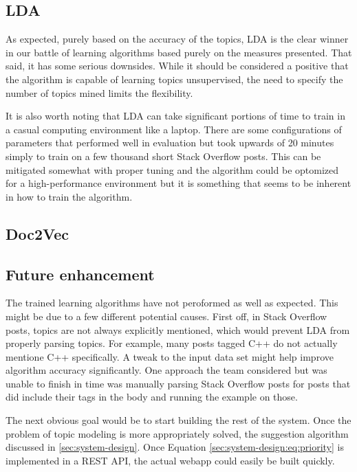 \subsection{LDA}
\label{sec:conc:lda}
As expected, purely based on the accuracy of the topics, LDA is the
clear winner in our battle of learning algorithms based purely on the
measures presented.
That said, it has some serious downsides.
While it should be considered a positive that the algorithm is capable
of learning topics unsupervised, the need to specify the number of
topics mined limits the flexibility.

It is also worth noting that LDA can take significant portions of time
to train in a casual computing environment like a laptop.
There are some configurations of parameters that performed well in
evaluation but took upwards of 20 minutes simply to train on a few
thousand short Stack Overflow posts.
This can be mitigated somewhat with proper tuning and the algorithm
could be optomized for a high-performance environment but it is
something that seems to be inherent in how to train the algorithm.

% 
\subsection{Doc2Vec}
\label{sec:conc:doc2vec}



\subsection{Future enhancement}
The trained learning algorithms have not peroformed as well as
expected.
This might be due to a few different potential causes.
First off, in Stack Overflow posts, topics are not always explicitly
mentioned, which would prevent LDA from properly parsing topics.
For example, many posts tagged C++ do not actually mentione C++
specifically.
A tweak to the input data set might help improve algorithm accuracy
significantly.
One approach the team considered but was unable to finish in time was
manually parsing Stack Overflow posts for posts that did include their
tags in the body and running the example on those.  

The next obvious goal would be to start building the rest of the
system.
Once the problem of topic modeling is more appropriately solved, the
suggestion algorithm discussed in \ref{sec:system-design}.
Once Equation \ref{sec:system-design:eq:priority} is implemented in a REST API, the
actual webapp could easily be built quickly.  

